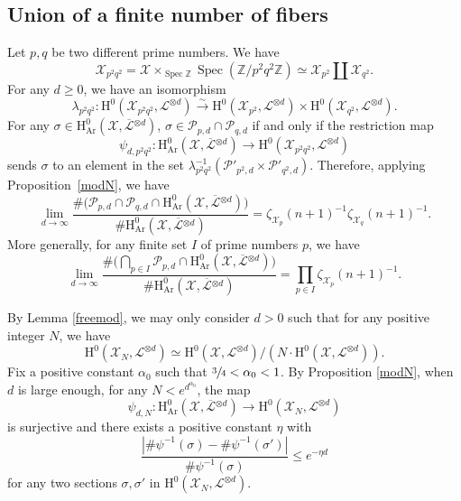 \documentclass[JEP,XML,SOM,Unicode,published]{cedram}
\theoremstyle{plain}
\theoremstyle{definition}
\newcommand{\ho}{\mathrm{H}}
\newcommand{\X}{\mathcal{X}}
\newcommand{\Li}{\overline{\mathcal{L}}{}}
\newcommand{\li}{\mathcal{L}}
\newcommand{\Z}{\mathbb{Z}}
\DeclareMathOperator{\Spec}{Spec}
\begin{document}
\subsection{Union of a finite number of fibers}

Let $p,q$ be two different prime numbers. We have
\[
\X_{p^2q^2} =\X\times_{\Spec \Z}\Spec(\Z/p^2q^2\Z)\simeq \X_{p^2}\amalg \X_{q^2}.
\]
For any $d\geq 0$, we have an isomorphism
\[
\lambda_{p^2q^2}: \ho^0(\X_{p^2q^2},\li^{\otimes d}) \stackrel{\sim}\to \ho^0(\X_{p^2},\li^{\otimes d}) \times \ho^0(\X_{q^2},\li^{\otimes d}).
\]
For any $\sigma \in \ho^0_{\mathrm{Ar}}(\X, \overline{\mathcal{L}}{}^{\otimes d})$, $\sigma\in \mathcal{P}_{p,d}\cap \mathcal{P}_{q,d}$ if and only if the restriction map
\[
\psi_{d,p^2q^2}: \ho^0_{\mathrm{Ar}}(\X,\Li^{\otimes d}) \to \ho^0(\X_{p^2q^2},\li^{\otimes d})
\]
sends $\sigma$ to an element in the set $\lambda^{-1}_{p^2q^2}(\mathcal{P}'_{p^2,d}\times \mathcal{P}'_{q^2,d})$. Therefore, applying Proposition~\ref{modN}, we have
\[
\lim_{d\to \infty}\frac{\#\bigl(\mathcal{P}_{p,d}\cap \mathcal{P}_{q,d}\cap \ho^0_{\mathrm{Ar}}(\X, \overline{\mathcal{L}}{}^{\otimes d})\bigr)}{\#\ho^0_{\mathrm{Ar}}(\X, \overline{\mathcal{L}}{}^{\otimes d})}=\zeta_{\X_p}(n+1)^{-1}\zeta_{\X_q}(n+1)^{-1}.
\]
More generally, for any finite set $I$ of prime numbers $p$, we have
\[
\lim_{d\to \infty}\frac{\#\bigl(\bigcap_{p\in I}\mathcal{P}_{p,d}\cap \ho^0_{\mathrm{Ar}}(\X, \overline{\mathcal{L}}{}^{\otimes d})\bigr)}{\#\ho^0_{\mathrm{Ar}}(\X, \overline{\mathcal{L}}{}^{\otimes d})}=\prod_{p\in I}\zeta_{\X_p}(n+1)^{-1}.
\]

By Lemma \ref{freemod}, we may only consider $d>0$ such that for any positive integer $N$, we have
\[
\ho^0(\X_N, \li^{\otimes d})\simeq \ho^0(\X, \li^{\otimes d})/(N\cdot\ho^0(\X, \li^{\otimes d})).
\]
Fix a positive constant $\alpha_0$ such that $\sfrac{3}{4}<\alpha_0<1$. By Proposition \ref{modN}, when $d$ is large enough, for any $N<e^{d^{\alpha_0}}$, the map
\[
\psi_{d,N}: \ho^0_{\mathrm{Ar}}(\X,\Li^{\otimes d}) \to \ho^0(\X_N,\li^{\otimes d})
\]
is surjective and there exists a positive constant $\eta$ with
\[
\frac{| \#\psi^{-1}(\sigma)- \#\psi^{-1}(\sigma') |}{\#\psi^{-1}(\sigma)}\leq e^{-\eta d}
\]
for any two sections $\sigma,\sigma'$ in $ \ho^0(\X_N,\li^{\otimes d})$.
\end{document}
